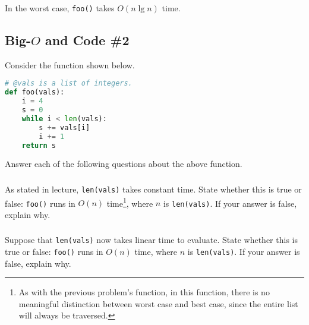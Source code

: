 \documentclass{article}
\begin{document}
\subsubsection{}

In the worst case, \lstinline{foo()} takes $O(n \lg n)$ time.

\begin{mdframed}
\vspace{3em}
\end{mdframed}

\subsection{Big-$O$ and Code \#2}

Consider the function shown below.

\begin{lstlisting}[language=Python]
# @vals is a list of integers.
def foo(vals):
    i = 4
    s = 0
    while i < len(vals):
        s += vals[i]
        i += 1
    return s
\end{lstlisting}

Answer each of the following questions about the above function.

\subsubsection{}

As stated in lecture, \lstinline{len(vals)} takes constant time. State whether this is true or false: \lstinline{foo()} runs in $O(n)$ time\footnote{As with the previous problem's function, in this function, there is no meaningful distinction between worst case and best case, since the entire list will always be traversed.}, where $n$ is \lstinline{len(vals)}. If your answer is false, explain why.

\begin{mdframed}
\vspace{3em}
\end{mdframed}

\subsubsection{}

Suppose that \lstinline{len(vals)} now takes linear time to evaluate. State whether this is true or false: \lstinline{foo()} runs in $O(n)$ time, where $n$ is \lstinline{len(vals)}. If your answer is false, explain why.
\end{document}
